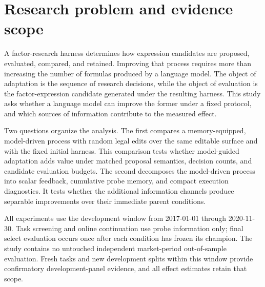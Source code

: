 \section{Research problem and evidence scope}
\label{sec:problem}

A factor-research harness determines how expression candidates are proposed, evaluated, compared, and retained. Improving that process requires more than increasing the number of formulas produced by a language model. The object of adaptation is the sequence of research decisions, while the object of evaluation is the factor-expression candidate generated under the resulting harness. This study asks whether a language model can improve the former under a fixed protocol, and which sources of information contribute to the measured effect.

Two questions organize the analysis. The first compares a memory-equipped, model-driven process with random legal edits over the same editable surface and with the fixed initial harness. This comparison tests whether model-guided adaptation adds value under matched proposal semantics, decision counts, and candidate evaluation budgets. The second decomposes the model-driven process into scalar feedback, cumulative probe memory, and compact execution diagnostics. It tests whether the additional information channels produce separable improvements over their immediate parent conditions.

All experiments use the development window from 2017-01-01 through 2020-11-30. Task screening and online continuation use probe information only; final select evaluation occurs once after each condition has frozen its champion. The study contains no untouched independent market-period out-of-sample evaluation. Fresh tasks and new development splits within this window provide confirmatory development-panel evidence, and all effect estimates retain that scope.
